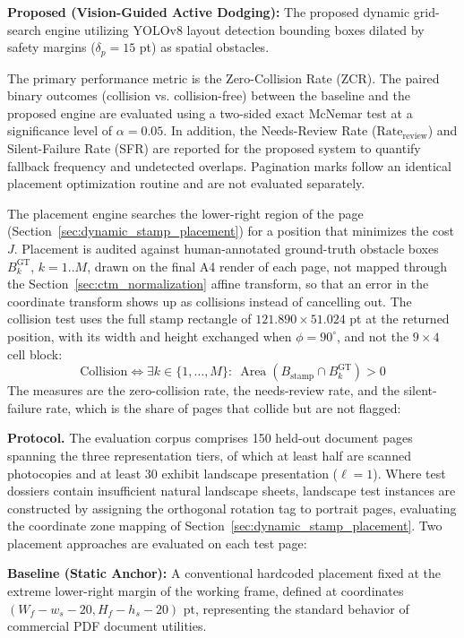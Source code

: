 \textbf{Proposed (Vision-Guided Active Dodging):} The proposed dynamic grid-search engine utilizing YOLOv8 layout detection bounding boxes dilated by safety margins ($\delta_p=15$ pt) as spatial obstacles.

The primary performance metric is the Zero-Collision Rate (ZCR). The paired binary outcomes (collision vs. collision-free) between the baseline and the proposed engine are evaluated using a two-sided exact McNemar test at a significance level of $\alpha=0.05$. In addition, the Needs-Review Rate ($\mathrm{Rate}_{\mathrm{review}}$) and Silent-Failure Rate (SFR) are reported for the proposed system to quantify fallback frequency and undetected overlaps. Pagination marks follow an identical placement optimization routine and are not evaluated separately.

The placement engine searches the lower-right region of the page (Section~\ref{sec:dynamic_stamp_placement}) for a position that minimizes the cost $J$. Placement is audited against human-annotated ground-truth obstacle boxes $B_k^{\mathrm{GT}}$, $k=1..M$, drawn on the final A4 render of each page, not mapped through the Section~\ref{sec:ctm_normalization} affine transform, so that an error in the coordinate transform shows up as collisions instead of cancelling out. The collision test uses the full stamp rectangle of $121.890 \times 51.024$ pt at the returned position, with its width and height exchanged when $\phi = 90^\circ$, and not the $9 \times 4$ cell block:
\begin{equation}
\text{Collision}\iff\exists k\in\{1,\ldots,M\}:\ \operatorname{Area}(B_{\text{stamp}}\cap B_k^{\text{GT}})>0
\end{equation}
The measures are the zero-collision rate, the needs-review rate, and the silent-failure rate, which is the share of pages that collide but are not flagged:

\textbf{Protocol.} The evaluation corpus comprises 150 held-out document pages spanning the three representation tiers, of which at least half are scanned photocopies and at least 30 exhibit landscape presentation ($\ell=1$). Where test dossiers contain insufficient natural landscape sheets, landscape test instances are constructed by assigning the orthogonal rotation tag to portrait pages, evaluating the coordinate zone mapping of Section~\ref{sec:dynamic_stamp_placement}. Two placement approaches are evaluated on each test page:

\textbf{Baseline (Static Anchor):} A conventional hardcoded placement fixed at the extreme lower-right margin of the working frame, defined at coordinates $(W_f-w_s-20,H_f-h_s-20)$ pt, representing the standard behavior of commercial PDF document utilities.

